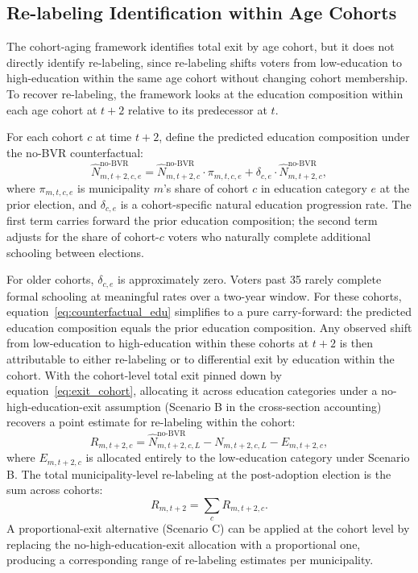 \subsection{Re-labeling Identification within Age Cohorts}
\label{ssec:decomposition_relabel}

The cohort-aging framework identifies total exit by age cohort, but it does not directly identify re-labeling, since re-labeling shifts voters from low-education to high-education within the same age cohort without changing cohort membership. To recover re-labeling, the framework looks at the education composition within each age cohort at $t+2$ relative to its predecessor at $t$.

For each cohort $c$ at time $t+2$, define the predicted education composition under the no-BVR counterfactual:
\begin{equation}
\widehat{N}_{m,t+2,c,e}^{\text{no-BVR}} = \widehat{N}_{m,t+2,c}^{\text{no-BVR}} \cdot \pi_{m,t,c,e} + \delta_{c,e} \cdot \widehat{N}_{m,t+2,c}^{\text{no-BVR}},
\label{eq:counterfactual_edu}
\end{equation}
where $\pi_{m,t,c,e}$ is municipality $m$'s share of cohort $c$ in education category $e$ at the prior election, and $\delta_{c,e}$ is a cohort-specific natural education progression rate. The first term carries forward the prior education composition; the second term adjusts for the share of cohort-$c$ voters who naturally complete additional schooling between elections.

For older cohorts, $\delta_{c,e}$ is approximately zero. Voters past 35 rarely complete formal schooling at meaningful rates over a two-year window. For these cohorts, equation~\eqref{eq:counterfactual_edu} simplifies to a pure carry-forward: the predicted education composition equals the prior education composition. Any observed shift from low-education to high-education within these cohorts at $t+2$ is then attributable to either re-labeling or to differential exit by education within the cohort. With the cohort-level total exit pinned down by equation~\eqref{eq:exit_cohort}, allocating it across education categories under a no-high-education-exit assumption (Scenario B in the cross-section accounting) recovers a point estimate for re-labeling within the cohort:
\begin{equation}
R_{m,t+2,c} = \widehat{N}_{m,t+2,c,L}^{\text{no-BVR}} - N_{m,t+2,c,L} - E_{m,t+2,c},
\label{eq:relabel_cohort}
\end{equation}
where $E_{m,t+2,c}$ is allocated entirely to the low-education category under Scenario B. The total municipality-level re-labeling at the post-adoption election is the sum across cohorts:
\begin{equation}
R_{m,t+2} = \sum_c R_{m,t+2,c}.
\label{eq:relabel_total}
\end{equation}
A proportional-exit alternative (Scenario C) can be applied at the cohort level by replacing the no-high-education-exit allocation with a proportional one, producing a corresponding range of re-labeling estimates per municipality.

